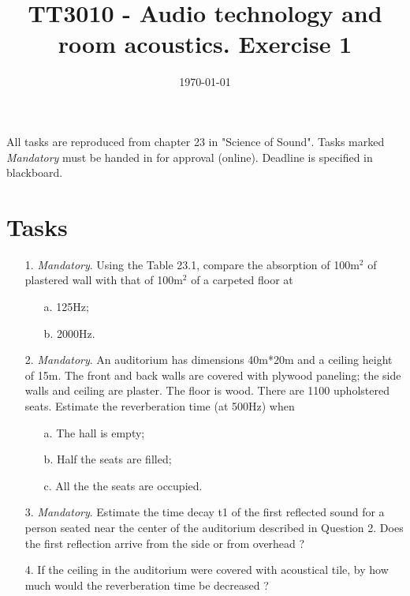 \documentclass{article}
\title{TT3010 - Audio technology and room acoustics. \newline Exercise 1}
\date{\today}
\begin{document}
\maketitle

All tasks are reproduced from chapter 23 in "Science of Sound". %
Tasks marked \textit{Mandatory} must be handed in for approval (online). Deadline is specified in blackboard. 

\section*{Tasks}
\begin{itemize}
    \item [1.] \textit{Mandatory}. Using the Table 23.1, compare the absorption of 100m$^2$ of plastered wall with that of 100m$^2$ of a carpeted floor at 
        \begin{itemize}
        \item [a.] 125Hz;
        \item[b.] 2000Hz.
        \end{itemize}
    
    \item[2.] \textit{Mandatory}. An auditorium has dimensions 40m*20m and a ceiling height of 15m. The front and back walls are covered with plywood paneling; the side walls and ceiling are plaster. The floor is wood. There are 1100 upholstered seats. Estimate the reverberation time (at 500Hz) when
            \begin{itemize}
        \item [a.] The hall is empty;
        \item[b.] Half the seats are filled;
        \item[c.] All the the seats are occupied.
        \end{itemize}
        
    \item[3.] \textit{Mandatory}. Estimate the time decay t1 of the first reflected sound for a person seated near the center of the auditorium described in Question 2. Does the first reflection arrive from the side or from overhead ?
    
    \item[4.]  If the ceiling in the auditorium were covered with acoustical tile, by how much would the reverberation time be decreased ?
    

\end{itemize}
\end{document}

